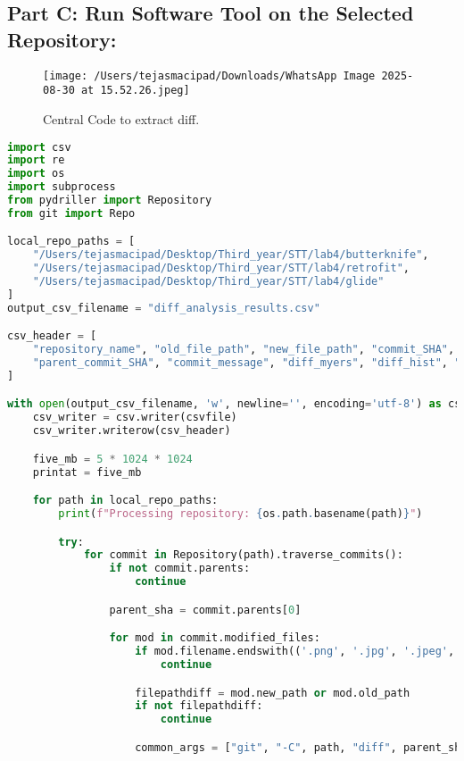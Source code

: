 \documentclass[12pt,a4paper]{article}
\begin{document}
\subsection*{Part C: Run Software Tool on the Selected Repository:}
\begin{figure}[h!]
    \centering
    \texttt{[image: /Users/tejasmacipad/Downloads/WhatsApp Image 2025-08-30 at 15.52.26.jpeg]}
    \caption{Central Code to extract diff.}
    \label{fig:diff-example}
\end{figure}

\begin{lstlisting}[language=Python, caption={Diff analysis script for selected repositories}]
import csv
import re
import os
import subprocess
from pydriller import Repository
from git import Repo

local_repo_paths = [
    "/Users/tejasmacipad/Desktop/Third_year/STT/lab4/butterknife",
    "/Users/tejasmacipad/Desktop/Third_year/STT/lab4/retrofit",
    "/Users/tejasmacipad/Desktop/Third_year/STT/lab4/glide"
]
output_csv_filename = "diff_analysis_results.csv"

csv_header = [
    "repository_name", "old_file_path", "new_file_path", "commit_SHA",
    "parent_commit_SHA", "commit_message", "diff_myers", "diff_hist", "Discrepancy"
]

with open(output_csv_filename, 'w', newline='', encoding='utf-8') as csvfile:
    csv_writer = csv.writer(csvfile)
    csv_writer.writerow(csv_header)

    five_mb = 5 * 1024 * 1024
    printat = five_mb

    for path in local_repo_paths:
        print(f"Processing repository: {os.path.basename(path)}")

        try:
            for commit in Repository(path).traverse_commits():
                if not commit.parents:
                    continue

                parent_sha = commit.parents[0]

                for mod in commit.modified_files:
                    if mod.filename.endswith(('.png', '.jpg', '.jpeg', '.gif', '.zip')):
                        continue

                    filepathdiff = mod.new_path or mod.old_path
                    if not filepathdiff:
                        continue

                    common_args = ["git", "-C", path, "diff", parent_sha, commit.hash, "--", filepathdiff]


\end{lstlisting}
\end{document}
